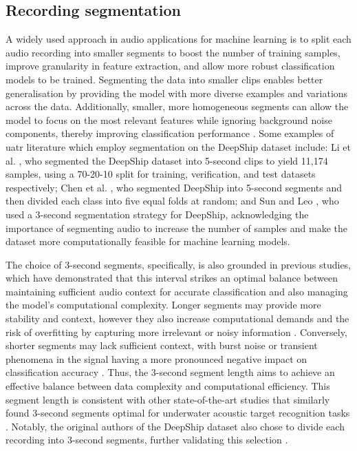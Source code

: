 \subsection{Recording segmentation}\label{subsec:segmentation}

A widely used approach in audio applications for machine learning is to split each audio recording into smaller segments to boost the number of training samples, improve granularity in feature extraction, and allow more robust classification models to be trained. Segmenting the data into smaller clips enables better generalisation by providing the model with more diverse examples and variations across the data. Additionally, smaller, more homogeneous segments can allow the model to focus on the most relevant features while ignoring background noise components, thereby improving classification performance \cite{xu_self-supervised_2023}. Some examples of \acrshort{uatr} literature which employ segmentation on the DeepShip dataset include: Li et al. \cite{li_underwater_2022}, who segmented the DeepShip dataset into 5-second clips to yield 11,174 samples, using a 70-20-10 split for training, verification, and test datasets respectively; Chen et al. \cite{chen_hierarchical_2024}, who segmented DeepShip into 5-second segments and then divided each class into five equal folds at random; and Sun and Leo \cite{sun_underwater_2023}, who used a 3-second segmentation strategy for DeepShip, acknowledging the importance of segmenting audio to increase the number of samples and make the dataset more computationally feasible for machine learning models. 

The choice of 3-second segments, specifically, is also grounded in previous studies, which have demonstrated that this interval strikes an optimal balance between maintaining sufficient audio context for accurate classification and also managing the model's computational complexity. Longer segments may provide more stability and context, however they also increase computational demands and the risk of overfitting by capturing more irrelevant or noisy information \cite{chen_ship-radiated_2024, li_underwater_2022}. Conversely, shorter segments may lack sufficient context, with burst noise or transient phenomena in the signal having a more pronounced negative impact on classification accuracy \cite{shen_auditory_2018, tang_deep_2024}. Thus, the 3-second segment length aims to achieve an effective balance between data complexity and computational efficiency. This segment length is consistent with other state-of-the-art studies that similarly found 3-second segments optimal for underwater acoustic target recognition tasks \cite{xu_self-supervised_2024, tang_deep_2024}. Notably, the original authors of the DeepShip dataset also chose to divide each recording into 3-second segments, further validating this selection \cite{irfan_deepship_2021}.

